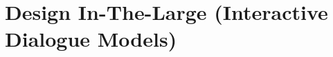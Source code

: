 \documentclass[../DD.tex]{subfiles}
\begin{document}
\chapter{Design In-The-Large (Interactive Dialogue Models)}
\thispagestyle{fancy}
	
	
	
	
\end{document}
